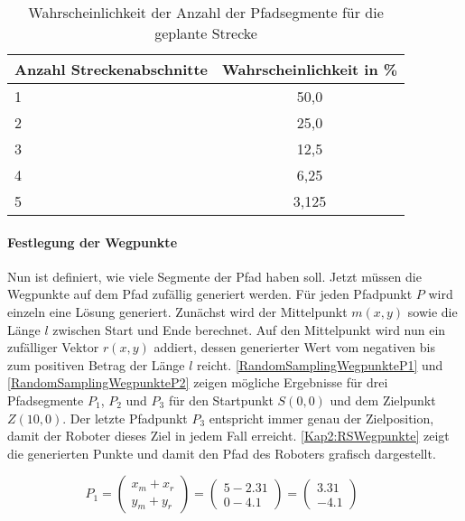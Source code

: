 \begin{table}[t]
  \caption{Wahrscheinlichkeit der Anzahl der Pfadsegmente für die geplante Strecke}
  \label{Kap3:streckenabschnittWahrscheinlichkeit}
  \centering
  \sffamily
  \begin{footnotesize}
    \begin{tabular}{l S[table-format=1.3,table-comparator=true,table-space-text-post={***}]}
    \toprule
    \textbf{Anzahl Streckenabschnitte} & \textbf{Wahrscheinlichkeit in \%}\\
     & 50,0\\
    2 & 25,0\\
    3 & 12,5\\
    4 & 6,25\\
    5 & 3,125\\
    \bottomrule
    \end{tabular}
  \end{footnotesize}
  \rmfamily
\end{table}

\paragraph{Festlegung der Wegpunkte}

Nun ist definiert, wie viele Segmente der Pfad haben soll. Jetzt müssen die Wegpunkte auf dem Pfad zufällig generiert werden. Für jeden Pfadpunkt $P$ wird einzeln eine Lösung generiert. Zunächst wird der Mittelpunkt $m(x, y)$ sowie die Länge $l$ zwischen Start und Ende berechnet. Auf den Mittelpunkt wird nun ein zufälliger Vektor $r(x, y)$ addiert, dessen generierter Wert vom negativen bis zum positiven Betrag der Länge $l$ reicht. \autoref{RandomSamplingWegpunkteP1} und \ref{RandomSamplingWegpunkteP2} zeigen mögliche Ergebnisse für drei Pfadsegmente $P_1$, $P_2$ und $P_3$ für den Startpunkt $S(0,0)$ und dem Zielpunkt $Z(10,0)$. Der letzte Pfadpunkt $P_3$ entspricht immer genau der Zielposition, damit der Roboter dieses Ziel in jedem Fall erreicht. \autoref{Kap2:RSWegpunkte} zeigt die generierten Punkte und damit den Pfad des Roboters grafisch dargestellt.

\begin{equation}
  P_1=\left(\begin{array}{c} x_m + x_r \\ y_m + y_r \end{array}\right)=\left(\begin{array}{c} 5 - 2.31 \\ 0 - 4.1 \end{array}\right)=\left(\begin{array}{c} 3.31 \\ -4.1 \end{array}\right) \qquad
\label{RandomSamplingWegpunkteP1}
\end{equation}


